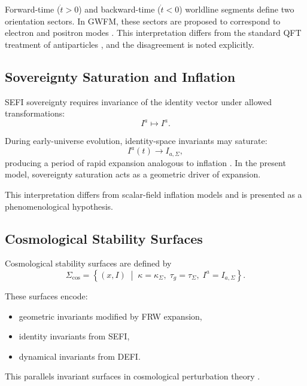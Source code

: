 \documentclass[aip,jmp,reprint,onecolumn,nofootinbib]{revtex4-2}
\begin{document}
Forward-time ($\dot{t}>0$) and backward-time ($\dot{t}<0$) worldline segments define two 
orientation sectors. In GWFM, these sectors are proposed to correspond to electron and 
positron modes \cite{DuttonElectronField2026}. This interpretation differs from the 
standard QFT treatment of antiparticles \cite{WeinbergQFT1,PeskinSchroeder}, and the 
disagreement is noted explicitly.

\subsection{Sovereignty Saturation and Inflation}

SEFI sovereignty requires invariance of the identity vector under allowed transformations:
\begin{equation}
I^a \mapsto I^a.
\end{equation}

During early-universe evolution, identity-space invariants may saturate:
\begin{equation}
I^a(t) \to I_{a,\Sigma},
\end{equation}
producing a period of rapid expansion analogous to inflation 
\cite{GuthInflation,LindeInflation}. In the present model, sovereignty saturation acts as a 
geometric driver of expansion.

This interpretation differs from scalar-field inflation models and is presented as a 
phenomenological hypothesis.

\subsection{Cosmological Stability Surfaces}

Cosmological stability surfaces are defined by
\begin{equation}
\Sigma_{\mathrm{cos}}
=
\left\{
(x,I)
\;\middle|\;
\kappa = \kappa_\Sigma,\;
\tau_g = \tau_\Sigma,\;
I^a = I_{a,\Sigma}
\right\}.
\end{equation}

These surfaces encode:
\begin{itemize}
\item geometric invariants modified by FRW expansion,
\item identity invariants from SEFI,
\item dynamical invariants from DEFI.
\end{itemize}

This parallels invariant surfaces in cosmological perturbation theory 
\cite{MukhanovBook,Dodelson}.
\end{document}

